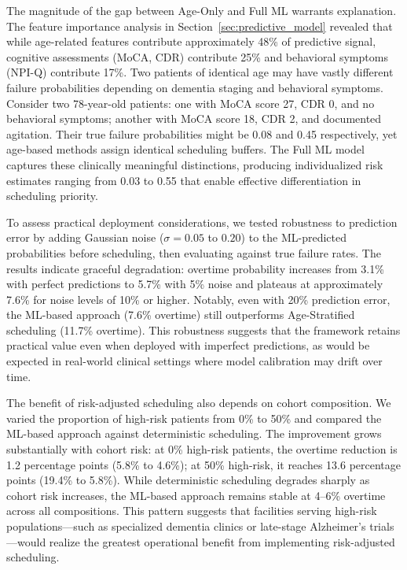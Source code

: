 The magnitude of the gap between Age-Only and Full ML warrants explanation. The feature importance analysis in Section~\ref{sec:predictive_model} revealed that while age-related features contribute approximately 48\% of predictive signal, cognitive assessments (MoCA, CDR) contribute 25\% and behavioral symptoms (NPI-Q) contribute 17\%. Two patients of identical age may have vastly different failure probabilities depending on dementia staging and behavioral symptoms. Consider two 78-year-old patients: one with MoCA score 27, CDR 0, and no behavioral symptoms; another with MoCA score 18, CDR 2, and documented agitation. Their true failure probabilities might be 0.08 and 0.45 respectively, yet age-based methods assign identical scheduling buffers. The Full ML model captures these clinically meaningful distinctions, producing individualized risk estimates ranging from 0.03 to 0.55 that enable effective differentiation in scheduling priority.

To assess practical deployment considerations, we tested robustness to prediction error by adding Gaussian noise ($\sigma = 0.05$ to $0.20$) to the ML-predicted probabilities before scheduling, then evaluating against true failure rates. The results indicate graceful degradation: overtime probability increases from 3.1\% with perfect predictions to 5.7\% with 5\% noise and plateaus at approximately 7.6\% for noise levels of 10\% or higher. Notably, even with 20\% prediction error, the ML-based approach (7.6\% overtime) still outperforms Age-Stratified scheduling (11.7\% overtime). This robustness suggests that the framework retains practical value even when deployed with imperfect predictions, as would be expected in real-world clinical settings where model calibration may drift over time.

The benefit of risk-adjusted scheduling also depends on cohort composition. We varied the proportion of high-risk patients from 0\% to 50\% and compared the ML-based approach against deterministic scheduling. The improvement grows substantially with cohort risk: at 0\% high-risk patients, the overtime reduction is 1.2 percentage points (5.8\% to 4.6\%); at 50\% high-risk, it reaches 13.6 percentage points (19.4\% to 5.8\%). While deterministic scheduling degrades sharply as cohort risk increases, the ML-based approach remains stable at 4--6\% overtime across all compositions. This pattern suggests that facilities serving high-risk populations---such as specialized dementia clinics or late-stage Alzheimer's trials---would realize the greatest operational benefit from implementing risk-adjusted scheduling.

